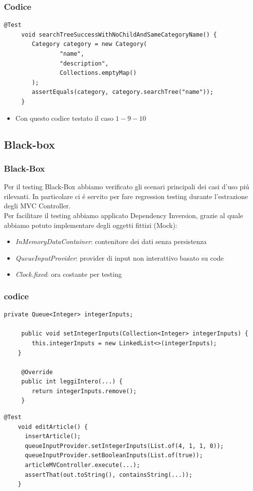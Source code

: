 \begin{frame} [fragile]
    \frametitle{Codice}
    \begin{lstlisting}[autogobble, title={\texttt{CategoryTest.java}}]
     @Test
     void searchTreeSuccessWithNoChildAndSameCategoryName() {
        Category category = new Category(
                "name",
                "description",
                Collections.emptyMap()
        );
        assertEquals(category, category.searchTree("name"));
     }
    \end{lstlisting}
    \begin{itemize}
        \item Con questo codice testato il caso $1-9-10$
    \end{itemize}
\end{frame}

\subsection{Black-box}
\beamertitle
\begin{frame}
    \frametitle{Black-Box}
    Per il testing Black-Box abbiamo verificato gli scenari principali dei casi d'uso
    piú rilevanti.
    In particolare ci é servito per fare regression testing durante l'estrazione
    degli MVC Controller.
    \\
    Per facilitare il testing abbiamo applicato Dependency Inversion, grazie al quale
    abbiamo potuto implementare degli oggetti fittizi (Mock):
    \begin{itemize}
        \item \emph{InMemoryDataContainer}: contenitore dei dati senza persistenza
        \item \emph{QueueInputProvider}: provider di input non interattivo basato su code
        \item \emph{Clock.fixed}: ora costante per testing
    \end{itemize}
\end{frame}

\begin{frame} [fragile]
    \frametitle{codice}
    \begin{lstlisting}[autogobble, title={\texttt{QueueInputProvider.java}}]
     private Queue<Integer> integerInputs;

     public void setIntegerInputs(Collection<Integer> integerInputs) {
        this.integerInputs = new LinkedList<>(integerInputs);
    }

     @Override
     public int leggiIntero(...) {
        return integerInputs.remove();
     }
    \end{lstlisting}
    \begin{lstlisting}[autogobble, title={\texttt{ArticleMVControllerTest.java}}]
    @Test
    void editArticle() {
      insertArticle();
      queueInputProvider.setIntegerInputs(List.of(4, 1, 1, 0));
      queueInputProvider.setBooleanInputs(List.of(true));
      articleMVController.execute(...);
      assertThat(out.toString(), containsString(...));
    }
    \end{lstlisting}
\end{frame}
